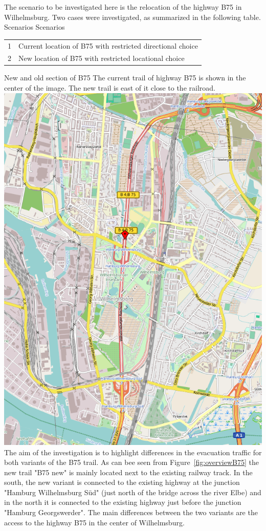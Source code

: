 The scenario to be investigated here is the relocation of the highway B75 in Wilhelmsburg. 
Two cases were investigated, as summarized in the following table.
%
\createtable%
	{Scenarios}%
	{Scenarios}%
	{\label{table:b75scenarios}}%
	{%
	\begin{tabular}{|l | l|}
	\hline
	1 & Current location of B75 with restricted directional choice\\
	2 & New location of B75 with restricted locational choice\\
	\hline
\end{tabular}
}%
{}%
%
\createfigure%
	{New and old section of B75}%
	{The current trail of highway B75 is shown in the center of the image. The new trail is east of it close to the railroad.}%
	{\label{fig:overviewB75}}%
	{\includegraphics[width=0.7\linewidth]{using/figures/B75overview}}%
{}
%
The aim of the investigation is to highlight differences in the evacuation traffic for both variants of the B75 trail. As can bee seen from Figure~\ref{fig:overviewB75} the new trail "B75 new" is mainly located next to the existing railway track. In the south, the new variant is connected to the existing highway at the junction "Hamburg Wilhelmsburg Süd" (just north of the bridge across the river Elbe) and in the north it is connected to the existing highway just before the junction "Hamburg Georgswerder". The main differences between the two variants are the access to the highway B75 in the center of Wilhelmsburg.

